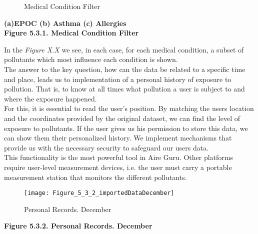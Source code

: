 \begin{figure}[ht]
  \centering
  \hfill
  \hfill
  \caption{Medical Condition Filter}
\end{figure}

\begin{center}
  \bf{ (a)EPOC (b) Asthma (c) Allergies\\
  
  Figure 5.3.1. Medical Condition Filter}
\end{center} 

In the \textit{Figure X.X} we see, in each case, for each medical condition, a subset of pollutants which most influence each condition is shown.\\
  
The answer to the key question, how can the data be related to a specific time and place, leads us to
implementation of a personal history of exposure to pollution. That is, to know at all times what pollution
a user is subject to and where the exposure happened.\\

For this, it is essential to read the user's position. By matching the users location and the coordinates provided by the original dataset,
we can find the level of exposure to pollutants. If the user gives us his permission to store this data, we can show them their personalized history.
We implement mechanisms that provide us with the necessary security to safeguard our users data.\\

This functionality is the most powerful tool in Aire Guru. Other platforms require user-level measurement devices, i.e. the user must carry
a portable measurement station that monitors the different pollutants.\\

\begin{figure}[ht]
  \centering
  \texttt{[image: Figure\_5\_3\_2\_importedDataDecember]}
  \caption{Personal Records. December}
\end{figure}

\begin{center}
  \bf{ 
  Figure 5.3.2. Personal Records. December}
\end{center} 

